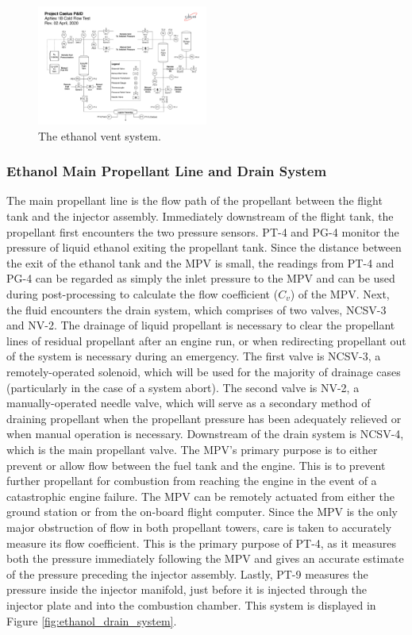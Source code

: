 \documentclass[9pt]{article} %
\numberwithin{equation}{section} %
\begin{document}
\begin{figure}[!htb] 
    \centering
    \includegraphics[scale=0.5, width=0.5\textwidth, trim={7.6cm 9.85cm 14.1cm 4cm}, clip]{Aphlex1B_04-02-2020_P&ID.pdf} %
    \caption{The ethanol vent system.}
    \label{fig:ethanol_vent_system}
\end{figure}

\subsubsection{Ethanol Main Propellant Line and Drain System}
\hspace{\parindent} The main propellant line is the flow path of the propellant between the flight tank and the injector assembly. Immediately downstream of the flight tank, the propellant first encounters the two pressure sensors. PT-4 and PG-4 monitor the pressure of liquid ethanol exiting the propellant tank. Since the distance between the exit of the ethanol tank and the MPV is small, the readings from PT-4 and PG-4 can be regarded as simply the inlet pressure to the MPV and can be used during post-processing to calculate the flow coefficient ($C_{v}$) of the MPV. Next, the fluid encounters the drain system, which comprises of two valves, NCSV-3 and NV-2. The drainage of liquid propellant is necessary to clear the propellant lines of residual propellant after an engine run, or when redirecting propellant out of the system is necessary during an emergency. The first valve is NCSV-3, a remotely-operated solenoid, which will be used for the majority of drainage cases (particularly in the case of a system abort). The second valve is NV-2, a manually-operated needle valve, which will serve as a secondary method of draining propellant when the propellant pressure has been adequately relieved or when manual operation is necessary. Downstream of the drain system is NCSV-4, which is the main propellant valve. The MPV's primary purpose is to either prevent or allow flow between the fuel tank and the engine. This is to prevent further propellant for combustion from reaching the engine in the event of a catastrophic engine failure. The MPV can be remotely actuated from either the ground station or from the on-board flight computer. Since the MPV is the only major obstruction of flow in both propellant towers, care is taken to accurately measure its flow coefficient. This is the primary purpose of PT-4, as it measures both the pressure immediately following the MPV and gives an accurate estimate of the pressure preceding the injector assembly. Lastly, PT-9 measures the pressure inside the injector manifold, just before it is injected through the injector plate and into the combustion chamber. This system is displayed in Figure \ref{fig:ethanol_drain_system}.
\end{document}
